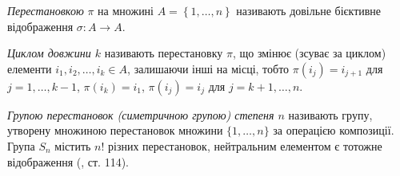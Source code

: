 \begin{definition}
    \emph{Перестановкою} $\pi$ на множині $A = \left\{1,\dots,n\right\}$
    називають довільне бієктивне відображення $\sigma: A \to A$.
\end{definition}
\begin{definition}
    \emph{Циклом довжини $k$} називають перестановку $\pi$, що змінює
    (зсуває за циклом) елементи $i_1, i_2, \dots, i_k \in A$, залишаючи
    інші на місці, тобто $\pi(i_{j}) = i_{j+1}$ для $j=1,\dots,k-1$,
    $\pi(i_k) = i_1$, $\pi(i_j) = i_j$ для $j = k+1, \dots, n$. 
\end{definition}
\begin{definition}
    \emph{Групою перестановок (симетричною групою) степеня $n$}
    називають групу, утворену множиною перестановок
    множини $\{1, \dots, n\}$ за операцією композиції.
    Група $S_n$ містить $n!$ різних перестановок, нейтральним елементом є
    тотожне відображення (\cite{Spectorsky}, ст. 114).
\end{definition}